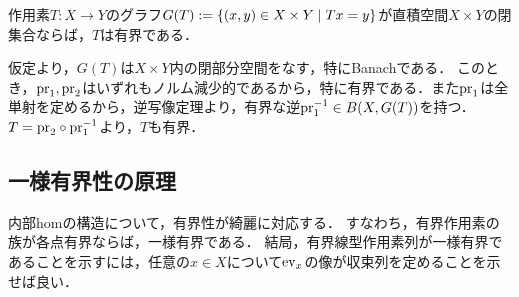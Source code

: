 \documentclass[uplatex,dvipdfmx]{jsreport}
\begin{document}
\begin{theorem}\label{thm-closed-graph-theorem}
    作用素$T:X\to Y$のグラフ$G(T):=\left\{(x,y)\in X\times Y\mid Tx=y\right\}$が直積空間$X\times Y$の閉集合ならば，$T$は有界である．
\end{theorem}
\begin{Proof}
    仮定より，$G(T)$は$X\times Y$内の閉部分空間をなす，特にBanachである．
    このとき，$\mathrm{pr}_1,\mathrm{pr}_2$はいずれもノルム減少的であるから，特に有界である．また$\mathrm{pr}_1$は全単射を定めるから，逆写像定理より，有界な逆$\mathrm{pr}_1^{-1}\in B(X,G(T))$を持つ．
    $T=\mathrm{pr}_2\circ\mathrm{pr}_1^{-1}$より，$T$も有界．
\end{Proof}

\subsection{一様有界性の原理}

\begin{tcolorbox}[colframe=ForestGreen, colback=ForestGreen!10!white,breakable,colbacktitle=ForestGreen!40!white,coltitle=black,fonttitle=\bfseries\sffamily,
title=]
    内部homの構造について，有界性が綺麗に対応する．
    すなわち，有界作用素の族が各点有界ならば，一様有界である．
    結局，有界線型作用素列が一様有界であることを示すには，任意の$x\in X$について$\mathrm{ev}_x$の像が収束列を定めることを示せば良い．
\end{tcolorbox}
\end{document}
